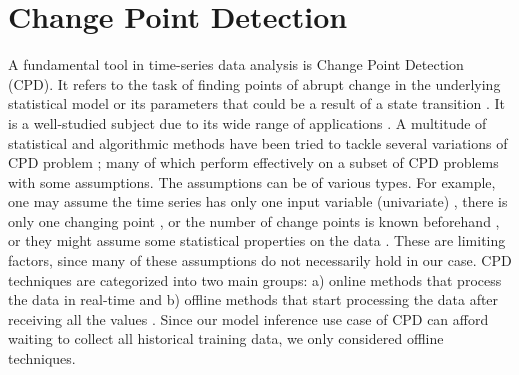 \section{Change Point Detection}
A fundamental tool in time-series data analysis is Change Point Detection (CPD). It refers to the task of finding points of abrupt change in the underlying statistical model or its parameters that could be a result of a state transition \cite{aminikhanghahi2017survey}. It is a well-studied subject due to its wide range of applications \cite{basseville1993detection}.
A multitude of statistical and algorithmic methods have been tried to tackle several variations of CPD problem \cite{chen2011parametric, hasan2014information, hsu1982bayesian, lee2017implicit, oh2002analyzing, ramos2016anomalies, chowdhury2012bayesian, reeves2007review, rosenfield2010change, wang2011non, xie2013sequential, yamanishi2004line, Lavielle1999}; many of which perform effectively on a subset of CPD problems with some assumptions. The assumptions can be of various types. For example, one may assume the time series has only one input variable (univariate) \cite{fryzlewicz2014wild}, there is only one changing point \cite{bai1998testing}, or the number of change points is known beforehand \cite{lavielle2005using}, or they might assume some statistical properties on the data \cite{chen2011parametric, takeuchi2006unifying, ide2007change}. These are limiting factors, since many of these assumptions do not necessarily hold in our case. CPD techniques are categorized into two main groups: a) online methods that process the data in real-time and b) offline methods that start processing the data after receiving all the values \cite{Truong2018ChangePointSurvey}. Since our model inference use case of CPD can afford waiting to collect all historical training data, we only considered offline techniques. %

